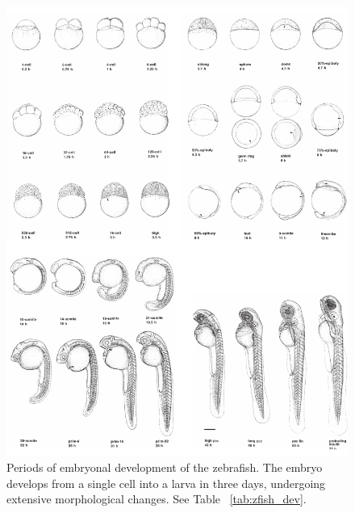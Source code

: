 \begin{figure}
 \centering
 \includegraphics{Chapters/tweezers/Figs/PDF/zebrafish_stages}
 \caption{
Periods of embryonal development of the \gls{zebrafish}.
The embryo develops from a single cell into a larva in three days, undergoing extensive morphological changes.
See Table ~\ref{tab:zfish_dev}.
 }\label{fig:zebrafish_stages}
\end{figure}

